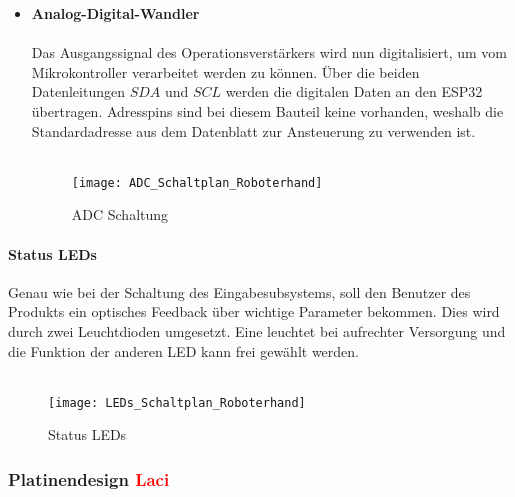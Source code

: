 \documentclass[titlepage,12pt,twoside]{article}
\begin{document}
\begin{itemize}
	\item \textbf{Analog-Digital-Wandler} \\
	\\
	Das Ausgangssignal des Operationsverstärkers wird nun digitalisiert, um vom Mikrokontroller verarbeitet werden zu können. Über die beiden Datenleitungen $SDA$ und $SCL$ werden die digitalen Daten an den ESP32 übertragen. 
	Adresspins sind bei diesem Bauteil keine vorhanden, weshalb die Standardadresse aus dem Datenblatt zur Ansteuerung zu verwenden ist. \\
	\\
	\begin{figure}[H]
		\begin{center}
			\scalebox{1.0}
			{\texttt{[image: ADC\_Schaltplan\_Roboterhand]}}
			\caption{ADC Schaltung}
			\label{fig:ADC_Schaltplan_Roboterhand}			
		\end{center}
	\end{figure}
	\hfill \break
\end{itemize}

\paragraph{Status LEDs}
\hfill \break
\hfill \break
Genau wie bei der Schaltung des Eingabesubsystems, soll den Benutzer des Produkts ein optisches Feedback über wichtige Parameter bekommen. Dies wird durch zwei Leuchtdioden umgesetzt. Eine leuchtet bei aufrechter Versorgung und die
Funktion der anderen LED kann frei gewählt werden. \\
\\
\begin{figure}[H]
	\begin{center}
		\scalebox{0.8}
		{\texttt{[image: LEDs\_Schaltplan\_Roboterhand]}}
		\caption{Status LEDs}
		\label{fig:LEDs_Schaltplan_Roboterhand}		
	\end{center}
\end{figure}
\hfill \break

\subsubsection{Platinendesign \textcolor{red}{Laci}}
\end{document}
